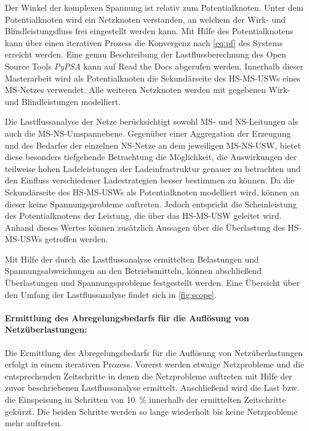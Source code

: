 Der Winkel der komplexen Spannung ist relativ zum Potentialknoten.
Unter dem Potentialknoten wird ein Netzknoten verstanden, an welchem der Wirk- und Blindleistungsfluss frei eingestellt werden kann.
Mit Hilfe des Potentialknotens kann über einen iterativen Prozess die Konvergenz nach \autoref{eq:pf} des Systems erreicht werden.
Eine genau Beschreibung der Lastflussberechnung des Open Source Tools \textit{PyPSA} kann auf Read the Docs \cite{Brown2020a} abgerufen werden.
Innerhalb dieser Masterarbeit wird als Potentialknoten die Sekundärseite des \gls{HS}-\gls{MS}-\glspl{USW} eines \gls{MS}-Netzes verwendet.
Alle weiteren Netzknoten werden mit gegebenen Wirk- und Blindleistungen modelliert. \cite{Schachler}\medskip

Die Lastflussanalyse der Netze berücksichtigt sowohl \gls{MS}- und \gls{NS}-Leitungen als auch die \gls{MS}-\gls{NS}-Umspannebene.
Gegenüber einer Aggregation der Erzeugung und des Bedarfes der einzelnen \gls{NS}-Netze an dem jeweiligen \gls{MS}-\gls{NS}-\gls{USW}, bietet diese besonders tiefgehende Betrachtung die Möglichkeit, die Auswirkungen der teilweise hohen Ladeleistungen der Ladeinfrastruktur genauer zu betrachten und den Einfluss verschiedener Ladestrategien besser bestimmen zu können.
Da die Sekundärseite des \gls{HS}-\gls{MS}-\glspl{USW} als Potentialknoten modelliert wird, können an dieser keine Spannungsprobleme auftreten.
Jedoch entspricht die Scheinleistung des Potentialknotens der Leistung, die über das \gls{HS}-\gls{MS}-\gls{USW} geleitet wird.
Anhand dieses Wertes können zusätzlich Aussagen über die Überlastung des \gls{HS}-\gls{MS}-\glspl{USW} getroffen werden.\medskip

Mit Hilfe der durch die Lastflussanalyse ermittelten Belastungen und Spannungsabweichungen an den Betriebsmitteln, können abschließend Überlastungen und Spannungsprobleme festgestellt werden.
Eine Übersicht über den Umfang der Lastflussanalyse findet sich in \autoref{fig:scope}. \cite{Schachler}




\paragraph{Ermittlung des Abregelungsbedarfs für die Auflösung von Netzüberlastungen:}

Die Ermittlung des Abregelungsbedarfs für die Auflösung von Netzüberlastungen erfolgt in einem iterativen Prozess.
Vorerst werden etwaige Netzprobleme und die entsprechenden Zeitschritte in denen die Netzprobleme auftreten mit Hilfe der zuvor beschriebenen Lastflussanalyse ermittelt.
Anschließend wird die Last bzw. die Einspeisung in Schritten von \SI{10}{\percent} innerhalb der ermittelten Zeitschritte gekürzt.
Die beiden Schritte werden so lange wiederholt bis keine Netzprobleme mehr auftreten.\medskip

